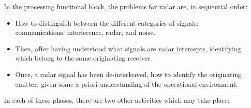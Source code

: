 In the processing functional block, the problems for radar are, in sequential order:

\begin{itemize}
    \item How to distinguish between the different categories of signals: communications, interference, radar, and noise.
    \item Then, after having understood what signals are radar intercepts, identifying which belong to the same originating receiver. 
    \item Once, a radar signal has been de-interleaved, how to identify the originating emitter, given some a priori understanding of the operational environment.
\end{itemize}

In each of these phases, there are two other activities which may take place:


